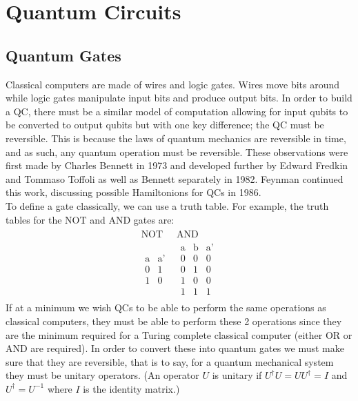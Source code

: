 \documentclass[reqno]{amsart}
\numberwithin{equation}{section}
\numberwithin{figure}{section}
\begin{document}
\section{Quantum Circuits}
\subsection{Quantum Gates}
\begin{justify}
    Classical computers are made of wires and logic gates. Wires move bits around while logic gates manipulate input bits and produce output bits. In order to build a QC, there must be a similar model of computation allowing for input qubits to be converted to output qubits but with one key difference; the QC must be reversible. This is because the laws of quantum mechanics are reversible in time, and as such, any quantum operation must be reversible. These observations were first made by Charles Bennett in 1973 \cite{Bennett1973} and developed further by Edward Fredkin and Tommaso Toffoli as well as Bennett separately in 1982. \cite{FredkinToffoli1982, Bennett1982} Feynman continued this work, discussing possible Hamiltonions for QCs in 1986. \cite{Feynman1986} \\

To define a gate classically, we can use a truth table. For example, the truth tables for the NOT and AND gates are:
    \begin{eqnarray}
        \begin{array}{c|c}
            \text{NOT} & \text{AND}\\
            \hline
            \begin{array}{c|c}
                \text{a} & \text{a'} \\
                \hline
                0 & 1 \\
                1 & 0
            \end{array} &
            \begin{array}{cc|c}
                \text{a} & \text{b} & \text{a'} \\
                \hline
                0 & 0 & 0 \\
                0 & 1 & 0 \\
                1 & 0 & 0 \\
                1 & 1 & 1
            \end{array}
        \end{array}
    \end{eqnarray}
    If at a minimum we wish QCs to be able to perform the same operations as classical computers, they must be able to perform these 2 operations since they are the minimum required for a Turing complete classical computer (either OR or AND are required). \cite{CopiCohenMcMahon2011} In order to convert these into quantum gates we must make sure that they are reversible, that is to say, for a quantum mechanical system they must be unitary operators. (An operator $U$ is unitary if $U^{\dagger}U = UU^{\dagger} = I$ and $U^{\dagger} = U^{-1}$ where $I$ is the identity matrix.) \\


\end{justify}
\end{document}
